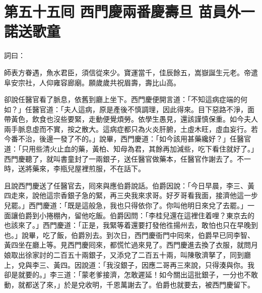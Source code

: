 
\chapter*{第五十五囘 西門慶兩番慶壽旦 苗員外一諾送歌童}


詞曰：

\begin{myquote}
師表方眷遇，魚水君臣，須信從來少。寶運當千，佳辰餘五，嵩嶽誕生元老。帝遣阜安宗社，人仰雍容廊廟。願歲歲共祝眉壽，壽比山高。

\end{myquote}

卻說任醫官看了脈息，依舊到廳上坐下。西門慶便開言道：「不知這病症端的何如？」任醫官道：「夫人這病，原是產後不慎調理，因此得來。目下惡路不淨，面帶黃色，飲食也沒些要緊，走動便覺煩勞。依學生愚見，還該謹慎保重。如今夫人兩手脈息虛而不實，按之散大。這病症都只為火炎肝腑，土虛木旺，虛血妄行。若今番不治，後邊一發了不的。」說畢，西門慶道：「如今該用甚藥纔好？」任醫官道：「只用些清火止血的藥，黃柏、知母為君，其餘再加減些，吃下看住就好了。」{}西門慶聽了，就叫書童封了一兩銀子，送任醫官做藥本，任醫官作謝去了。不一時，送將藥來，李瓶兒屋裡煎服，不在話下。

且說西門慶送了任醫官去，囘來與應伯爵說話。伯爵因說：「今日早晨，李三、黃四走來，說他這宗香銀子急的緊，再三央我來求哥。好歹哥看我面，接濟他這一步兒罷。」西門慶道：「既是這般急，我也只得依你了。你叫他明日來兌了去罷。」一面讓伯爵到小捲棚內，留他吃飯。伯爵因問：「李桂兒還在這裡住着哩？東京去的也該來了。」西門慶道：「正是，我緊等着還要打發他徃揚州去，敢怕也只在早晚到也。」說畢，吃了飯，伯爵別去。到次日，西門慶衙門中囘來，伯爵早已同李智、黃四坐在廳上等。見西門慶囘來，都慌忙過來見了。西門慶進去換了衣服，就問月娘取出徐家討的二百五十兩銀子，又添兌了二百五十兩，叫陳敬濟拏了，同到廳上，兌與李三、黃四。因說道：「我沒銀子，因應二哥再三來說，只得湊與你。我卻是就要的。」李三道：「蒙老爹接濟，怎敢遲延！如今關出這批銀子，一分也不敢動，就都送了來，」於是兌收明，千恩萬謝去了。伯爵也就要去，被西門慶留下。

